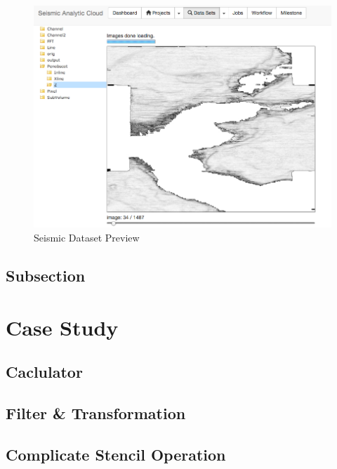 \begin{figure}[H]
\centering
\includegraphics[scale=.45]{figures/DataSet.png}
\caption{Seismic Dataset Preview}
\label{Template}
\end{figure}
\subsection{Subsection}


\section{Case Study}


\subsection{Caclulator}




\subsection{Filter \& Transformation}



\subsection{Complicate Stencil Operation}





